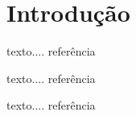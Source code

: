 \chapter{Introdução}

texto.... referência~\cite{carpenter91}

texto.... referência~\cite{chomsky57}

texto.... referência~\cite{chomsky65}









